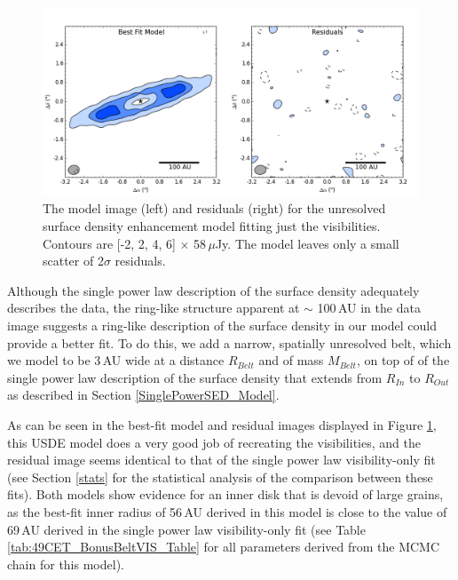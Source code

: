 \begin{figure}[t!]
\centering
\includegraphics[width = 1\textwidth]{49CET_BonusBeltVIS_ModelResidual.png}
\caption{The model image (left) and residuals (right) for the unresolved surface density enhancement model fitting just the visibilities. Contours are [-2, 2, 4, 6] $\times$ 58$\,\mu$Jy. The model leaves only a small scatter of 2$\sigma$ residuals.}
\label{fig:49CET_BonusBeltVIS_ModelResidual}
\end{figure}

Although the single power law description of the surface density adequately describes the data, the ring-like structure apparent at $\sim$ 100\,AU in the data image suggests a ring-like description of the surface density in our model could provide a better fit. To do this, we add a narrow, spatially unresolved belt, which we model to be 3\,AU wide at a distance $R_{Belt}$ and of mass $M_{Belt}$, on top of of the single power law description of the surface density that extends from $R_{In}$ to $R_{Out}$ as described in Section \ref{SinglePowerSED_Model}. 

As can be seen in the best-fit model and residual images displayed in Figure \ref{fig:49CET_BonusBeltVIS_ModelResidual}, this USDE model does a very good job of recreating the visibilities, and the residual image seems identical to that of the single power law visibility-only fit (see Section \ref{stats} for the statistical analysis of the comparison between these fits). Both models show evidence for an inner disk that is devoid of large grains, as the best-fit inner radius of 56\,AU derived in this model is close to the value of 69\,AU derived in the single power law visibility-only fit (see Table \ref{tab:49CET_BonusBeltVIS_Table} for all parameters derived from the MCMC chain for this model). 



